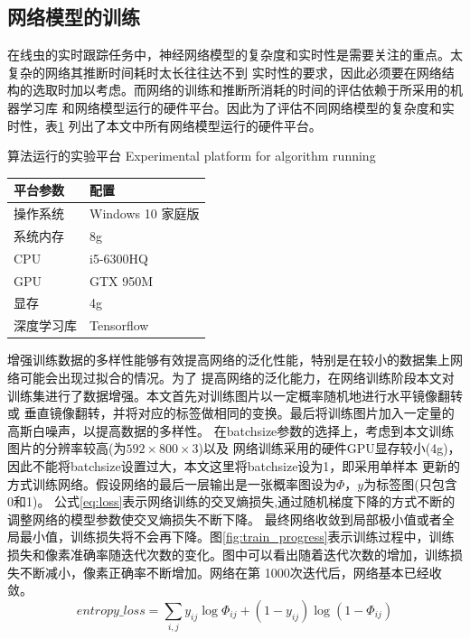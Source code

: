 \subsection{网络模型的训练}
	在线虫的实时跟踪任务中，神经网络模型的复杂度和实时性是需要关注的重点。太复杂的网络其推断时间耗时太长往往达不到
	实时性的要求，因此必须要在网络结构的选取时加以考虑。而网络的训练和推断所消耗的时间的评估依赖于所采用的机器学习库
	和网络模型运行的硬件平台。因此为了评估不同网络模型的复杂度和实时性，表\ref{tab:hardwareconfig}
	列出了本文中所有网络模型运行的硬件平台。
	\begin{table}[!hpb]
	\centering
	\bicaption
    {算法运行的实验平台}
    {Experimental platform for algorithm running}
	\label{tab:hardwareconfig}
	\begin{tabular}{p{80pt}p{100pt}}
	\toprule
	平台参数 & 配置 \\
	\midrule
	操作系统 & Windows 10 家庭版\\
	系统内存 & 8g \\
	CPU & i5-6300HQ \\
	GPU & GTX 950M \\
	显存 & 4g \\
	深度学习库 & Tensorflow \\
	\bottomrule
	\end{tabular}
	\end{table}
	
	增强训练数据的多样性能够有效提高网络的泛化性能，特别是在较小的数据集上网络可能会出现过拟合的情况。为了
	提高网络的泛化能力，在网络训练阶段本文对训练集进行了数据增强。本文首先对训练图片以一定概率随机地进行水平镜像翻转或
	垂直镜像翻转，并将对应的标签做相同的变换。最后将训练图片加入一定量的高斯白噪声，以提高数据的多样性。
	在batchsize参数的选择上，考虑到本文训练图片的分辨率较高(为$592\times800\times3$)以及
	网络训练采用的硬件GPU显存较小(4g)，因此不能将batchsize设置过大，本文这里将batchsize设为1，即采用单样本
	更新的方式训练网络。假设网络的最后一层输出是一张概率图设为$\Phi$，$y$为标签图(只包含0和1)。
	公式\ref{eq:loss}表示网络训练的交叉熵损失,通过随机梯度下降的方式不断的调整网络的模型参数使交叉熵损失不断下降。
	最终网络收敛到局部极小值或者全局最小值，训练损失将不会再下降。图\ref{fig:train_progress}表示训练过程中，训练
	损失和像素准确率随迭代次数的变化。图中可以看出随着迭代次数的增加，训练损失不断减小，像素正确率不断增加。网络在第
	1000次迭代后，网络基本已经收敛。
	\begin{equation}
		entropy\_loss = \sum_{i,j}y_{ij}\log \Phi_{ij} + (1-y_{ij})\log (1-\Phi_{ij}) \label{eq:loss}
	\end{equation}
	
